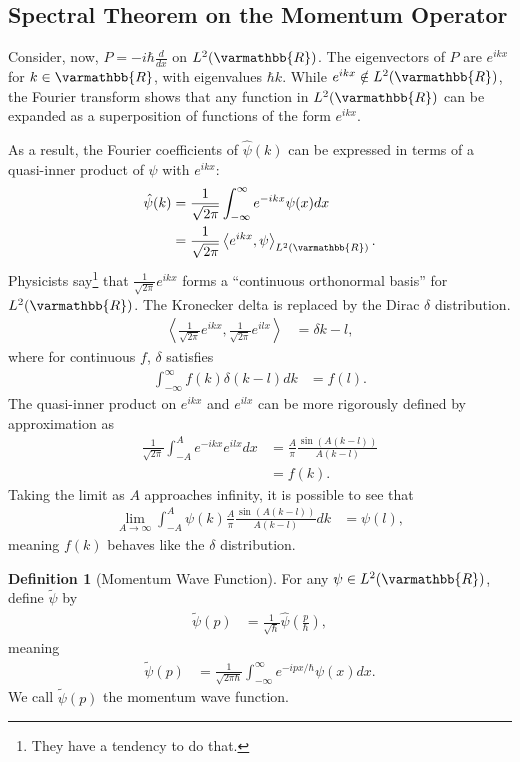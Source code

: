 \documentclass[12pt]{extarticle}
\newcommand{\R}{\varmathbb{R}}
\newcommand{\iprod}[2]{\left\langle #1,#2\right\rangle}
\theoremstyle{plain}
\theoremstyle{definition}
\newtheorem*{definition}{Definition}
\theoremstyle{remark}
\renewcommand{\newline}{\hfill\break}
\begin{document}
  \subsection{Spectral Theorem on the Momentum Operator}%
  Consider, now, $P = -i\hbar \frac{d }{dx}$ on $L^{2}(\R)$. The eigenvectors of $P$ are $e^{ikx}$ for $k\in \R$, with eigenvalues $\hbar k$. While $e^{ikx}\notin L^{2}(\R)$, the Fourier transform shows that any function in $L^{2}(\R)$ can be expanded as a superposition of functions of the form $e^{ikx}$.\newline

  As a result, the Fourier coefficients of $\hat{\psi}(k)$ can be expressed in terms of a quasi-inner product of $\psi$ with $e^{ikx}$:
  \begin{align*}
    \hat{\psi}(k) &= \frac{1}{\sqrt{2\pi}}\int_{-\infty}^{\infty} e^{-ikx}\psi(x) dx\\
                  &= \frac{1}{\sqrt{2\pi}}\iprod{e^{ikx}}{\psi}_{L^{2}(\R)}.
  \end{align*}
  Physicists say\footnote{They have a tendency to do that.} that $\frac{1}{\sqrt{2\pi}}e^{ikx}$ forms a ``continuous orthonormal basis'' for $L^{2}(\R)$. The Kronecker delta is replaced by the Dirac $\delta$ distribution.
  \begin{align*}
    \iprod{\frac{1}{\sqrt{2\pi}}e^{ikx}}{\frac{1}{\sqrt{2\pi}}e^{ilx}} &= \delta{k-l},
  \end{align*}
  where for continuous $f$, $\delta$ satisfies
  \begin{align*}
    \int_{-\infty}^{\infty} f(k)\delta(k-l) dk &= f(l).
  \end{align*}
  The quasi-inner product on $e^{ikx}$ and $e^{ilx}$ can be more rigorously defined by approximation as
  \begin{align*}
    \frac{1}{\sqrt{2\pi}}\int_{-A}^{A} e^{-ikx}e^{ilx} dx &= \frac{A}{\pi}\frac{\sin\left(A(k-l)\right)}{A(k-l)}\\
                                                          &= f(k).
  \end{align*}
  Taking the limit as $A$ approaches infinity, it is possible to see that
  \begin{align*}
    \lim_{A\rightarrow\infty}\int_{-A}^{A} \psi(k)\frac{A}{\pi}\frac{\sin\left(A(k-l)\right)}{A(k-l)} dk &= \psi(l),
  \end{align*}
  meaning $f(k)$ behaves like the $\delta$ distribution.
  \begin{definition}[Momentum Wave Function]
    For any $\psi \in L^{2}(\R)$, define $\tilde{\psi}$ by
    \begin{align*}
      \tilde{\psi}(p) &= \frac{1}{\sqrt{\hbar}}\hat{\psi}\left(\frac{p}{\hbar}\right),
    \end{align*}
    meaning
    \begin{align*}
      \tilde{\psi}(p) &= \frac{1}{\sqrt{2\pi \hbar}}\int_{-\infty}^{\infty} e^{-ipx/\hbar}\psi(x) dx.
    \end{align*}
    We call $\tilde{\psi}(p)$ the momentum wave function.
  \end{definition}
\end{document}

